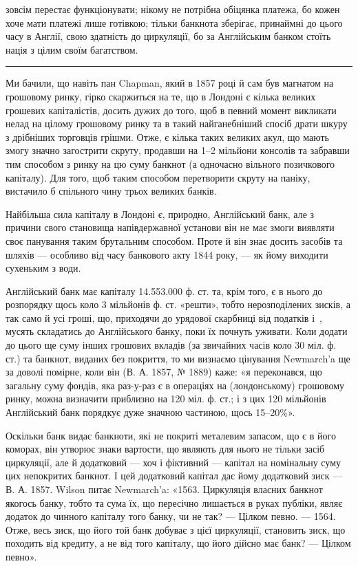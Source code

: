 \parcont{}  %
зовсім перестає функціонувати; нікому не потрібна обіцянка платежа, бо кожен
хоче мати платежі лише готівкою; тільки банкнота зберігає, принаймні до цього
часу в Англії, свою здатність до циркуляції, бо за Англійським банком стоїть
нація з цілим своїм багатством.

\pfbreak

Ми бачили, що навіть пан Chapman, який в 1857 році й сам був магнатом
на грошовому ринку, гірко скаржиться на те, що в Лондоні є кілька великих
грошевих капіталістів, досить дужих до того, щоб в певний момент викликати
нелад на цілому грошовому ринку та в такий найганебніший спосіб драти шкуру
з дрібніших торговців грішми. Отже, є кілька таких великих акул, що мають
змогу значно загострити скруту, продавши на 1--2 мільйони консолів та забравши
тим способом з ринку на цю суму банкнот (а одночасно вільного позичкового
капіталу). Для того, щоб таким способом перетворити скруту на паніку,
вистачило б спільного чину трьох великих банків.

Найбільша сила капіталу в Лондоні є, природно, Англійський банк, але
з причини свого становища напівдержавної установи він не має змоги виявляти
своє панування таким брутальним способом. Проте й він знає досить засобів
та шляхів — особливо від часу банкового акту 1844 року, — як йому виходити
сухеньким з води.

Англійський банк має капіталу \num{14.553.000} ф. ст. та, крім того, є в нього
до розпорядку щось коло 3 мільйонів ф. ст. «решти», тобто нерозподілених зисків,
а так само й усі гроші, що, приходячи до урядової скарбниці від податків
і~, мусять складатись до Англійського банку, поки їх почнуть уживати.
Коли додати до цього ще суму інших грошових вкладів (за звичайних часів
коло 30 міл. ф. ст.) та банкнот, виданих без покриття, то ми визнаємо цінування
Newmarch’a ще за доволі помірне, коли він (В. А. 1857, № 1889)
каже: «я переконався, що загальну суму фондів, яка раз-у-раз є в операціях
на (лондонському) грошовому ринку, можна визначити приблизно на 120 міл.
ф. ст.; і з цих 120 мільйонів Англійський банк порядкує дуже значною частиною,
щось 15--20\%».

Оскільки банк видає банкноти, які не покриті металевим запасом, що є в його
коморах, він утворює знаки вартости, що являють для нього не тільки засіб циркуляції,
але й додатковий — хоч і фіктивний — капітал на номінальну суму цих непокритих
банкнот. І цей додатковий капітал дає йому додатковий зиск — В. А. 1857.
Wilson питає Newmarch’a: «1563. Циркуляція власних банкнот якогось банку,
тобто та сума їх, що пересічно лишається в руках публіки, являє додаток до
чинного капіталу того банку, чи не так? — Цілком певно. — 1564. Отже, весь
зиск, що його той банк добуває з цієї циркуляції, становить зиск, що походить
від кредиту, а не від того капіталу, що його дійсно має банк? — Цілком певно».

